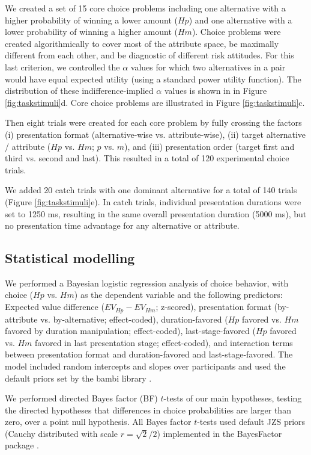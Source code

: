 \documentclass[11pt, a4paper, twocolumn, abstract]{scrartcl}
\begin{document}
We created a set of 15 core choice problems including one alternative with a higher probability of winning a lower amount ($Hp$) and one alternative with a lower probability of winning a higher amount ($Hm$). Choice problems were created algorithmically to cover most of the attribute space, be maximally different from each other, and be diagnostic of different risk attitudes. For this last criterion, we controlled the $\alpha$ values for which two alternatives in a pair would have equal expected utility (using a standard power utility function). The distribution of these indifference-implied $\alpha$ values is shown in in Figure \ref{fig:taskstimuli}d. Core choice problems are illustrated in Figure \ref{fig:taskstimuli}c.

Then eight trials were created for each core problem by fully crossing the factors (i) presentation format (alternative-wise vs. attribute-wise), (ii) target alternative / attribute ($Hp$ vs. $Hm$; $p$ vs. $m$), and (iii) presentation order (target first and third vs. second and last). This resulted in a total of 120 experimental choice trials. 

We added 20 catch trials with one dominant alternative for a total of 140 trials (Figure \ref{fig:taskstimuli}e). In catch trials, individual presentation durations were set to 1250 ms, resulting in the same overall presentation duration (5000 ms), but no presentation time advantage for any alternative or attribute.


\subsection*{Statistical modelling}
We performed a Bayesian logistic regression analysis of choice behavior, with choice ($Hp$ vs. $Hm$) as the dependent variable and the following predictors: Expected value difference ($EV_{Hp} - EV_{Hm}$; z-scored), presentation format (by-attribute vs. by-alternative; effect-coded), duration-favored ($Hp$ favored vs. $Hm$ favored by duration manipulation; effect-coded), last-stage-favored ($Hp$ favored vs. $Hm$ favored in last presentation stage; effect-coded), and interaction terms between presentation format and duration-favored and last-stage-favored. The model included random intercepts and slopes over participants and used the default priors set by the bambi library \parencite{westfall2017StatisticalDetailsDefault}.

We performed directed Bayes factor (BF) $t$-tests \parencite{morey2011BayesFactorApproaches} of our main hypotheses, testing the directed hypotheses that differences in choice probabilities are larger than zero, over a point null hypothesis. All Bayes factor $t$-tests used default JZS priors (Cauchy distributed with scale $r = \sqrt{2}/2$) implemented in the BayesFactor package \parencite{morey2018BayesFactorComputation}.
\end{document}
